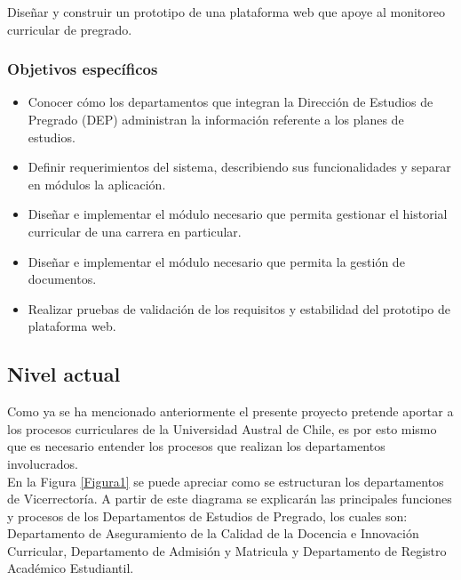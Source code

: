 	Diseñar y construir  un prototipo de una plataforma web que apoye al monitoreo curricular de pregrado. \\
	\vspace{-0.4cm}
	
	\subsubsection{Objetivos específicos}
	
	\begin{itemize}
		\item Conocer cómo los departamentos que integran la Dirección de Estudios de Pregrado (DEP) administran
		la información referente a los planes de estudios.
		\item  Definir requerimientos del sistema, describiendo sus funcionalidades y separar en módulos la aplicación.
		\item Diseñar e implementar el módulo necesario que permita gestionar el historial curricular de una carrera en particular.
		\item Diseñar e implementar el módulo necesario que permita la gestión de documentos.
		\item Realizar pruebas de validación de los requisitos y estabilidad del prototipo de plataforma web.
	\end{itemize}
	
	\subsection{Nivel actual}
	
		Como ya se ha mencionado anteriormente el presente proyecto pretende aportar a los procesos curriculares de la Universidad Austral de Chile, es por esto mismo que es necesario entender los procesos que realizan los departamentos involucrados.
		\\
		
		En la Figura \ref{Figura1} se puede apreciar como se estructuran los departamentos de Vicerrectoría. A partir de este diagrama se explicarán las principales funciones y procesos de los Departamentos de Estudios de Pregrado, los cuales son: Departamento de Aseguramiento de la Calidad de la Docencia e Innovación Curricular, Departamento de Admisión y Matricula y Departamento de Registro Académico Estudiantil.
	
